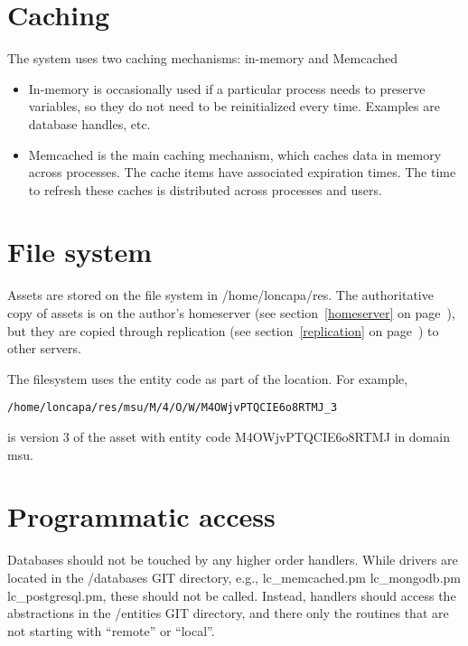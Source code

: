 \section{Caching}
The system uses two caching mechanisms: in-memory and Memcached
\begin{itemize}
\item In-memory is occasionally used if a particular process needs to preserve variables, so they do not need to be reinitialized every time. Examples are database handles, etc.
\item Memcached is the main caching mechanism, which caches data in memory across processes. The cache items have associated expiration times. The time to refresh these caches is distributed across processes and users.
\end{itemize}
\section{File system}
Assets are stored on the file system in /home/loncapa/res. The authoritative copy of assets is on the author's homeserver (see section~\ref{homeserver} on page~\pageref{homeserver}), but they are copied through replication (see section~\ref{replication} on page~\pageref{replication}) to other servers.

The filesystem uses the entity code as part of the location. For example,
\begin{verbatim}
/home/loncapa/res/msu/M/4/O/W/M4OWjvPTQCIE6o8RTMJ_3
\end{verbatim}
is version 3 of the asset with entity code M4OWjvPTQCIE6o8RTMJ in domain msu.

\section{Programmatic access}
Databases should not be touched by any higher order handlers. While drivers are located in the /databases GIT directory, e.g., lc\_memcached.pm  lc\_mongodb.pm  lc\_postgresql.pm, these should not be called. Instead, handlers should access the abstractions in the /entities GIT directory, and there only the routines that are not starting with ``remote'' or ``local''.
